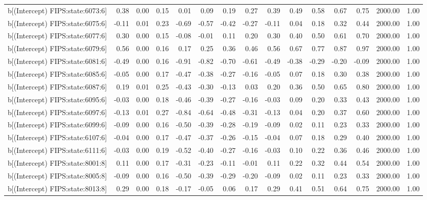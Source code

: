 \begin{table}[ht]
\begin{tabular}{rrrrrrrrrrrrrrr}
  b[(Intercept) FIPS:state:6073:6] & 0.38 & 0.00 & 0.15 & 0.01 & 0.09 & 0.19 & 0.27 & 0.39 & 0.49 & 0.58 & 0.67 & 0.75 & 2000.00 & 1.00 \\ 
  b[(Intercept) FIPS:state:6075:6] & -0.11 & 0.01 & 0.23 & -0.69 & -0.57 & -0.42 & -0.27 & -0.11 & 0.04 & 0.18 & 0.32 & 0.44 & 2000.00 & 1.00 \\ 
  b[(Intercept) FIPS:state:6077:6] & 0.30 & 0.00 & 0.15 & -0.08 & -0.01 & 0.11 & 0.20 & 0.30 & 0.40 & 0.50 & 0.61 & 0.70 & 2000.00 & 1.00 \\ 
  b[(Intercept) FIPS:state:6079:6] & 0.56 & 0.00 & 0.16 & 0.17 & 0.25 & 0.36 & 0.46 & 0.56 & 0.67 & 0.77 & 0.87 & 0.97 & 2000.00 & 1.00 \\ 
  b[(Intercept) FIPS:state:6081:6] & -0.49 & 0.00 & 0.16 & -0.91 & -0.82 & -0.70 & -0.61 & -0.49 & -0.38 & -0.29 & -0.20 & -0.09 & 2000.00 & 1.00 \\ 
  b[(Intercept) FIPS:state:6085:6] & -0.05 & 0.00 & 0.17 & -0.47 & -0.38 & -0.27 & -0.16 & -0.05 & 0.07 & 0.18 & 0.30 & 0.38 & 2000.00 & 1.00 \\ 
  b[(Intercept) FIPS:state:6087:6] & 0.19 & 0.01 & 0.25 & -0.43 & -0.30 & -0.13 & 0.03 & 0.20 & 0.36 & 0.50 & 0.65 & 0.80 & 2000.00 & 1.00 \\ 
  b[(Intercept) FIPS:state:6095:6] & -0.03 & 0.00 & 0.18 & -0.46 & -0.39 & -0.27 & -0.16 & -0.03 & 0.09 & 0.20 & 0.33 & 0.43 & 2000.00 & 1.00 \\ 
  b[(Intercept) FIPS:state:6097:6] & -0.13 & 0.01 & 0.27 & -0.84 & -0.64 & -0.48 & -0.31 & -0.13 & 0.04 & 0.20 & 0.37 & 0.60 & 2000.00 & 1.00 \\ 
  b[(Intercept) FIPS:state:6099:6] & -0.09 & 0.00 & 0.16 & -0.50 & -0.39 & -0.28 & -0.19 & -0.09 & 0.02 & 0.11 & 0.23 & 0.33 & 2000.00 & 1.00 \\ 
  b[(Intercept) FIPS:state:6107:6] & -0.04 & 0.00 & 0.17 & -0.47 & -0.37 & -0.26 & -0.15 & -0.04 & 0.07 & 0.18 & 0.29 & 0.40 & 2000.00 & 1.00 \\ 
  b[(Intercept) FIPS:state:6111:6] & -0.03 & 0.00 & 0.19 & -0.52 & -0.40 & -0.27 & -0.16 & -0.03 & 0.10 & 0.22 & 0.36 & 0.46 & 2000.00 & 1.00 \\ 
  b[(Intercept) FIPS:state:8001:8] & 0.11 & 0.00 & 0.17 & -0.31 & -0.23 & -0.11 & -0.01 & 0.11 & 0.22 & 0.32 & 0.44 & 0.54 & 2000.00 & 1.00 \\ 
  b[(Intercept) FIPS:state:8005:8] & -0.09 & 0.00 & 0.16 & -0.50 & -0.39 & -0.29 & -0.20 & -0.09 & 0.02 & 0.11 & 0.23 & 0.33 & 2000.00 & 1.00 \\ 
  b[(Intercept) FIPS:state:8013:8] & 0.29 & 0.00 & 0.18 & -0.17 & -0.05 & 0.06 & 0.17 & 0.29 & 0.41 & 0.51 & 0.64 & 0.75 & 2000.00 & 1.00 \\ 

\end{tabular}
\end{table}
